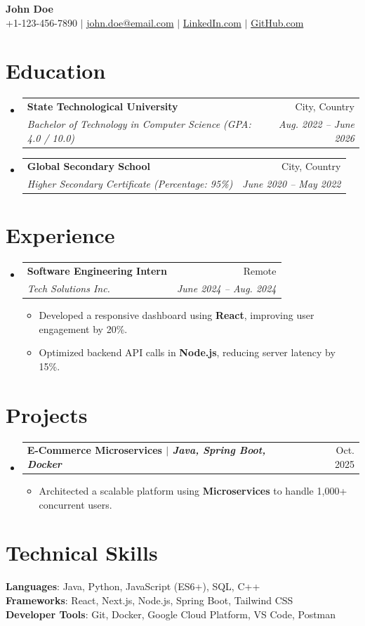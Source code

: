 \documentclass[a4paper,11pt]{article}
\makeatletter
\newcommand{\resumeItem}[1]{
  \item\small{{#1 \vspace{-2pt}}}
}
\newcommand{\resumeSubheading}[4]{
  \vspace{-2pt}\item
    \begin{tabular*}{0.97\textwidth}[t]{l@{\extracolsep{\fill}}r}
      \textbf{#1} & #2 \\
      \textit{\small#3} & \textit{\small #4} \\
    \end{tabular*}\vspace{-7pt}
}
\newcommand{\resumeProjectHeading}[2]{
    \item
    \begin{tabular*}{0.97\textwidth}{l@{\extracolsep{\fill}}r}
      \small\textbf{#1} & #2 \\
    \end{tabular*}\vspace{-7pt}
}
\newcommand{\resumeSubHeadingListStart}{\begin{itemize}[leftmargin=0.15in, label={}]}
\newcommand{\resumeSubHeadingListEnd}{\end{itemize}}
\newcommand{\resumeItemListStart}{\begin{itemize}}
\newcommand{\resumeItemListEnd}{\end{itemize}\vspace{-5pt}}
\makeatother
\begin{document}
\begin{center}
    \textbf{\Huge John Doe} \\ \vspace{1pt}
    \small +1-123-456-7890 $|$ \href{mailto:john.doe@email.com}{john.doe@email.com} $|$ 
    \href{https://linkedin.com/in/johndoe}{LinkedIn.com} $|$
    \href{https://github.com/johndoe}{GitHub.com}
\end{center}

\section{Education}
  \resumeSubHeadingListStart
    \resumeSubheading
      {State Technological University}{City, Country}
      {Bachelor of Technology in Computer Science (GPA: 4.0 / 10.0)}{Aug. 2022 -- June 2026}
    \resumeSubheading
      {Global Secondary School}{City, Country}
      {Higher Secondary Certificate (Percentage: 95\%)}{June 2020 -- May 2022}
  \resumeSubHeadingListEnd

\section{Experience}
  \resumeSubHeadingListStart
    \resumeSubheading
      {Software Engineering Intern}{Remote}
      {Tech Solutions Inc.}{June 2024 -- Aug. 2024}
      \resumeItemListStart
        \resumeItem{Developed a responsive dashboard using \textbf{React}, improving user engagement by 20\%.}
        \resumeItem{Optimized backend API calls in \textbf{Node.js}, reducing server latency by 15\%.}
      \resumeItemListEnd
  \resumeSubHeadingListEnd

\section{Projects}
    \resumeSubHeadingListStart
      \resumeProjectHeading
          {\textbf{E-Commerce Microservices} $|$ \emph{Java, Spring Boot, Docker}}{Oct. 2025}
          \resumeItemListStart
            \resumeItem{Architected a scalable platform using \textbf{Microservices} to handle 1,000+ concurrent users.}
          \resumeItemListEnd
    \resumeSubHeadingListEnd

\section{Technical Skills}
 \begin{itemize}[leftmargin=0.15in, label={}]
    \small{\item{
     \textbf{Languages}{: Java, Python, JavaScript (ES6+), SQL, C++} \\
     \textbf{Frameworks}{: React, Next.js, Node.js, Spring Boot, Tailwind CSS} \\
     \textbf{Developer Tools}{: Git, Docker, Google Cloud Platform, VS Code, Postman}
    }}
 \end{itemize}
 
\end{document}
